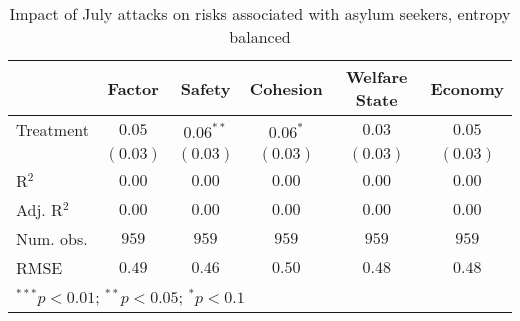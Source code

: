 
\begin{table}
\caption{Impact of July attacks on risks associated with asylum seekers, entropy balanced}
\begin{center}
\begin{tabular}{l c c c c c}
\toprule
 & Factor & Safety & Cohesion & Welfare State & Economy \\
\midrule
Treatment  & $0.05$   & $0.06^{**}$ & $0.06^{*}$ & $0.03$   & $0.05$   \\
           & $(0.03)$ & $(0.03)$    & $(0.03)$   & $(0.03)$ & $(0.03)$ \\
\midrule
R$^2$      & $0.00$   & $0.00$      & $0.00$     & $0.00$   & $0.00$   \\
Adj. R$^2$ & $0.00$   & $0.00$      & $0.00$     & $0.00$   & $0.00$   \\
Num. obs.  & $959$    & $959$       & $959$      & $959$    & $959$    \\
RMSE       & $0.49$   & $0.46$      & $0.50$     & $0.48$   & $0.48$   \\
\bottomrule
\multicolumn{6}{l}{\scriptsize{$^{***}p<0.01$; $^{**}p<0.05$; $^{*}p<0.1$}}
\end{tabular}
\label{tab_risk_match}
\end{center}
\end{table}
